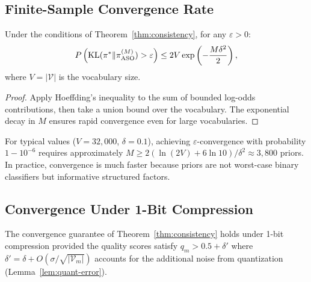 \subsection{Finite-Sample Convergence Rate}

\begin{theorem}
\label{thm:rate}
Under the conditions of Theorem~\ref{thm:consistency}, for any $\varepsilon > 0$:
\begin{equation}
    P\left(\operatorname{KL}(\pi^* \| \pi_{\text{ASO}}^{(M)}) > \varepsilon\right)
    \leq 2V \exp\left(-\frac{M \delta^2}{2}\right),
\end{equation}
where $V = |\mathcal{V}|$ is the vocabulary size.
\end{theorem}

\begin{proof}
Apply Hoeffding's inequality to the sum of bounded log-odds contributions, then
take a union bound over the vocabulary. The exponential decay in $M$ ensures
rapid convergence even for large vocabularies.
\end{proof}

\begin{remark}
For typical values ($V = 32{,}000$, $\delta = 0.1$), achieving
$\varepsilon$-convergence with probability $1 - 10^{-6}$ requires approximately
$M \geq 2(\ln(2V) + 6\ln 10) / \delta^2 \approx 3{,}800$ priors. In practice,
convergence is much faster because priors are not worst-case binary classifiers
but informative structured factors.
\end{remark}

\subsection{Convergence Under 1-Bit Compression}

\begin{corollary}
The convergence guarantee of Theorem~\ref{thm:consistency} holds under 1-bit
compression provided the quality scores satisfy $q_m > 0.5 + \delta'$ where
$\delta' = \delta + O(\sigma / \sqrt{|\mathcal{V}_m|})$ accounts for the
additional noise from quantization (Lemma~\ref{lem:quant-error}).
\end{corollary}

